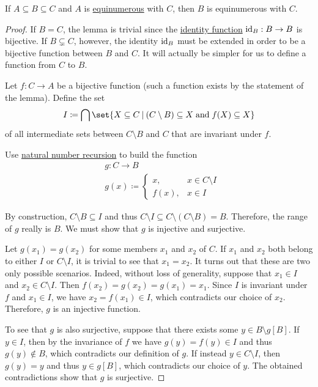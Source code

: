 \begin{lemma}\label{thm:three_equinumerous_sets_lemma}
  If \( A \subseteq B \subseteq C \) and \( A \) is \hyperref[def:equinumerosity]{equinumerous} with \( C \), then \( B \) is equinumerous with \( C \).
\end{lemma}
\begin{proof}
  If \( B = C \), the lemma is trivial since the \hyperref[def:multi_valued_function/identity]{identity function} \( \operatorname{id}_B: B \to B \) is bijective. If \( B \subsetneq C \), however, the identity \( \operatorname{id}_B \) must be extended in order to be a bijective function between \( B \) and \( C \). It will actually be simpler for us to define a function from \( C \) to \( B \).

  Let \( f: C \to A \) be a bijective function (such a function exists by the statement of the lemma). Define the set
  \begin{equation*}
    I \coloneqq \bigcap\set{ X \subseteq C \given (C \setminus B) \subseteq X \T{and} f(X) \subseteq X }
  \end{equation*}
  of all intermediate sets between \( C \setminus B \) and \( C \) that are invariant under \( f \).

  Use \hyperref[rem:natural_number_recursion]{natural number recursion} to build the function
  \begin{equation*}
    \begin{aligned}
      &g: C \to B \\
      &g(x) \coloneqq \begin{cases}
        x,    &x \in C \setminus I \\
        f(x), &x \in I
      \end{cases}
    \end{aligned}
  \end{equation*}

  By construction, \( C \setminus B \subseteq I \) and thus \( C \setminus I \subseteq C \setminus (C \setminus B) = B \). Therefore, the range of \( g \) really is \( B \). We must show that \( g \) is injective and surjective.

  Let \( g(x_1) = g(x_2) \) for some members \( x_1 \) and \( x_2 \) of \( C \). If \( x_1 \) and \( x_2 \) both belong to either \( I \) or \( C \setminus I \), it is trivial to see that \( x_1 = x_2 \). It turns out that these are two only possible scenarios. Indeed, without loss of generality, suppose that \( x_1 \in I \) and \( x_2 \in C \setminus I \). Then \( f(x_2) = g(x_2) = g(x_1) = x_1 \). Since \( I \) is invariant under \( f \) and \( x_1 \in I \), we have \( x_2 = f(x_1) \in I \), which contradicts our choice of \( x_2 \). Therefore, \( g \) is an injective function.

  To see that \( g \) is also surjective, suppose that there exists some \( y \in B \setminus g[B] \). If \( y \in I \), then by the invariance of \( f \) we have \( g(y) = f(y) \in I \) and thus \( g(y) \not\in B \), which contradicts our definition of \( g \). If instead \( y \in C \setminus I \), then \( g(y) = y \) and thus \( y \in g[B] \), which contradicts our choice of \( y \). The obtained contradictions show that \( g \) is surjective.
\end{proof}

